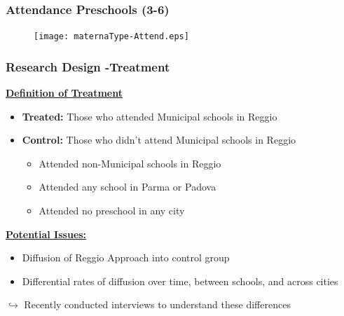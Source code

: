 \begin{frame}
\frametitle{Attendance Preschools (3-6)} 
\begin{center}
\begin{figure}
\texttt{[image: maternaType-Attend.eps]}
\end{figure}
\end{center}
\end{frame}
\begin{frame}
\frametitle{Research Design -Treatment} 
\underline{\textbf{Definition of Treatment}}
\begin{itemize}
	\item \textbf{Treated:} Those who attended Municipal schools in Reggio
	\smallskip
	\item \textbf{Control:} Those who didn't attend Municipal schools in Reggio
	\begin{itemize}
		\item Attended non-Municipal schools in Reggio
		\item Attended any school in Parma or Padova
		\item Attended no preschool in any city
	\end{itemize}
\end{itemize}
\bigskip
\underline{\textbf{Potential Issues:}}
\begin{itemize}
	\item Diffusion of Reggio Approach into control group
	\item Differential rates of diffusion over time, between schools, and across cities
\end{itemize}
\begin{block}{}
$\mathbf{\hookrightarrow}$ Recently conducted interviews to understand these differences
\end{block}

\end{frame}
